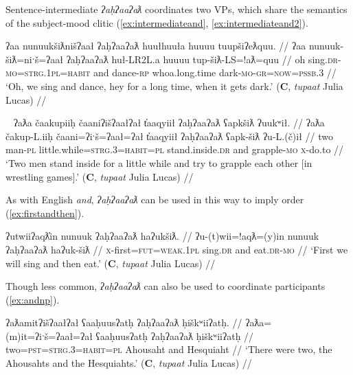 
Sentence-intermediate \textit{ʔaḥʔaaʔaƛ} coordinates two VPs, which share the semantics of the subject-mood clitic (\ref{ex:intermediateand}, \ref{ex:intermediateand2}).

\ex \label{ex:intermediateand}
\begingl
\glpreamble ʔaa nunuukšiƛnišʔaał ʔaḥʔaaʔaƛ huułhuuła huuuu tuupšiʔeƛquu. //
\gla ʔaa nunuuk-šiƛ=niˑš=ʔaał ʔaḥʔaaʔaƛ huł-LR2L.a huuuu tup-šiƛ-LS=!aƛ=quu //
\glb oh sing.\textsc{dr}-\textsc{mo}=\textsc{strg.1pl}=\textsc{habit} and dance-\textsc{rp} whoa.long.time dark-\textsc{mo}-\textsc{gr}=\textsc{now}=\textsc{pssb.3} //
\glft `Oh, we sing and dance, hey for a long time, when it gets dark.' (\textbf{C}, \textit{tupaat} Julia Lucas) //
\endgl
\xe


\ex~ \label{ex:intermediateand2}
\begingl
\glpreamble ʔaƛa čaakupiiḥ čaaniʔišʔaałʔał t̓aaqyiił ʔaḥʔaaʔaƛ ʕapkšiƛ ʔuukʷił. //
\gla ʔaƛa čakup-L.iiḥ čaani=ʔiˑš=ʔaał=ʔał t̓aaqyiił ʔaḥʔaaʔaƛ ʕapk-šiƛ ʔu-L.(č)ił //
\glb two man-\textsc{pl} little.while=\textsc{strg.3}=\textsc{habit}=\textsc{pl} stand.inside.\textsc{dr} and grapple-\textsc{mo} \textsc{x}-do.to //
\glft `Two men stand inside for a little while and try to grapple each other [in wrestling games].' (\textbf{C}, \textit{tupaat} Julia Lucas) //
\endgl
\xe

As with English \textit{and}, \textit{ʔaḥʔaaʔaƛ} can be used in this way to imply order (\ref{ex:firstandthen}).

\ex \label{ex:firstandthen}
\begingl
\glpreamble ʔutwiiʔaqƛ̓in nunuuk ʔaḥʔaaʔaƛ haʔukšiƛ. //
\gla ʔu-(t)wii=!aqƛ=(y)in nunuuk ʔaḥʔaaʔaƛ haʔuk-šiƛ //
\glb \textsc{x}-first=\textsc{fut}=\textsc{weak.1pl} sing.\textsc{dr} and eat.\textsc{dr}-\textsc{mo} //
\glft `First we will sing and then eat.' (\textbf{C}, \textit{tupaat} Julia Lucas) //
\endgl
\xe

Though less common, \textit{ʔaḥʔaaʔaƛ} can also be used to coordinate participants (\ref{ex:andnp}).

\ex \label{ex:andnp}
\begingl
\glpreamble ʔaƛamitʔišʔaałʔał ʕaaḥuusʔatḥ ʔaḥʔaaʔaƛ ḥiškʷiiʔatḥ. //
\gla ʔaƛa=(m)it=ʔiˑš=ʔaał=ʔał ʕaaḥuusʔatḥ ʔaḥʔaaʔaƛ ḥiškʷiiʔatḥ //
\glb two=\textsc{pst}=\textsc{strg.3}=\textsc{habit}=\textsc{pl} Ahousaht and Hesquiaht //
\glft `There were two, the Ahousahts and the Hesquiahts.' (\textbf{C}, \textit{tupaat} Julia Lucas) //
\endgl
\xe

